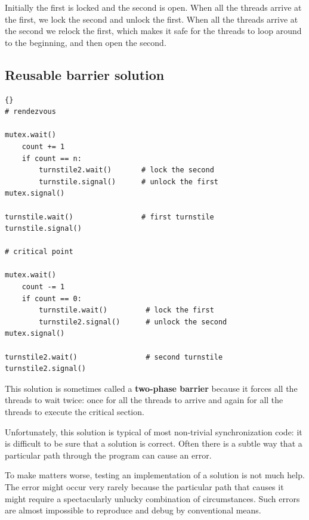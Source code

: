 \documentclass{book}
\newcommand{\clearemptydoublepage}{\newpage\cleardoublepage}
\begin{document}
Initially the first is locked and the second is open.  When all the
threads arrive at the first, we lock the second and unlock the first.
When all the threads arrive at the second we relock the first,
which makes it safe for the threads to loop around to the beginning,
and then open the second.



\clearemptydoublepage
\subsection {Reusable barrier solution}

\begin{latin}
\begin{latin}
\begin{lstlisting}[title={Reusable barrier solution}]{}
# rendezvous

mutex.wait()
    count += 1
    if count == n:
        turnstile2.wait()       # lock the second
        turnstile.signal()      # unlock the first
mutex.signal()

turnstile.wait()                # first turnstile
turnstile.signal()

# critical point

mutex.wait()
    count -= 1
    if count == 0: 
        turnstile.wait()         # lock the first
        turnstile2.signal()      # unlock the second
mutex.signal()

turnstile2.wait()                # second turnstile
turnstile2.signal()
\end{lstlisting}
\end{latin}
\end{latin}

This solution is sometimes called a {\bf two-phase barrier} because
it forces all the threads to wait twice: once for all the threads
to arrive and again for all the threads to execute the critical
section.

Unfortunately, this solution is typical of most non-trivial
synchronization code: it is difficult to be sure that a solution is
correct.  Often there is a subtle way that a particular path through
the program can cause an error.

To make matters worse, testing an implementation of a solution
is not much help.  The error might occur very rarely
because the particular path that causes it might
require a spectacularly unlucky combination of circumstances.
Such errors are almost
impossible to reproduce and debug by conventional means.
\end{document}
